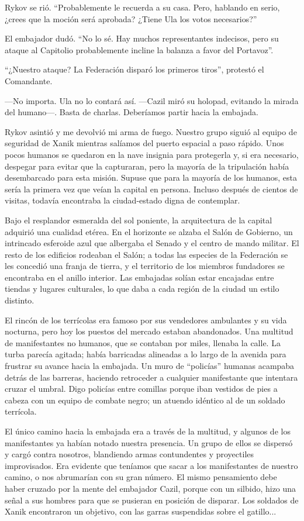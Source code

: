 Rykov se rió. ``Probablemente le recuerda a su casa. Pero, hablando en serio, ¿crees que la moción será aprobada? ¿Tiene Ula los votos necesarios?''


El embajador dudó. ``No lo sé. Hay muchos representantes indecisos, pero su ataque al Capitolio probablemente incline la balanza a favor del Portavoz''.

``¿Nuestro ataque? La Federación disparó los primeros tiros'', protestó el Comandante.

—No importa. Ula no lo contará así. —Cazil miró su holopad, evitando la mirada del humano—. Basta de charlas. Deberíamos partir hacia la embajada.

Rykov asintió y me devolvió mi arma de fuego. Nuestro grupo siguió al equipo de seguridad de Xanik mientras salíamos del puerto espacial a paso rápido. Unos pocos humanos se quedaron en la nave insignia para protegerla y, si era necesario, despegar para evitar que la capturaran, pero la mayoría de la tripulación había desembarcado para esta misión. Supuse que para la mayoría de los humanos, esta sería la primera vez que veían la capital en persona. Incluso después de cientos de visitas, todavía encontraba la ciudad-estado digna de contemplar.

Bajo el resplandor esmeralda del sol poniente, la arquitectura de la capital adquirió una cualidad etérea. En el horizonte se alzaba el Salón de Gobierno, un intrincado esferoide azul que albergaba el Senado y el centro de mando militar. El resto de los edificios rodeaban el Salón; a todas las especies de la Federación se les concedió una franja de tierra, y el territorio de los miembros fundadores se encontraba en el anillo interior. Las embajadas solían estar encajadas entre tiendas y lugares culturales, lo que daba a cada región de la ciudad un estilo distinto.

El rincón de los terrícolas era famoso por sus vendedores ambulantes y su vida nocturna, pero hoy los puestos del mercado estaban abandonados. Una multitud de manifestantes no humanos, que se contaban por miles, llenaba la calle. La turba parecía agitada; había barricadas alineadas a lo largo de la avenida para frustrar su avance hacia la embajada. Un muro de ``policías''
 humanas acampaba detrás de las barreras, haciendo retroceder a cualquier manifestante que intentara cruzar el umbral. Digo policías entre comillas porque iban vestidos de pies a cabeza con un equipo de combate negro; un atuendo idéntico al de un soldado terrícola.

El único camino hacia la embajada era a través de la multitud, y algunos de los manifestantes ya habían notado nuestra presencia. Un grupo de ellos se dispersó y cargó contra nosotros, blandiendo armas contundentes y proyectiles improvisados. Era evidente que teníamos que sacar a los manifestantes de nuestro camino, o nos abrumarían con su gran número. El mismo pensamiento debe haber cruzado por la mente del embajador Cazil, porque con un silbido, hizo una señal a sus hombres para que se pusieran en posición de disparar. Los soldados de Xanik encontraron un objetivo, con las garras suspendidas sobre el gatillo...


